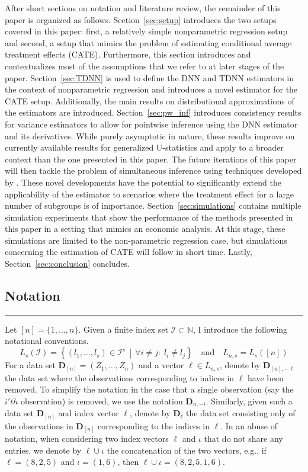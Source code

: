 After short sections on notation and literature review, the remainder of this paper is organized as follows.
Section~\ref{sec:setup} introduces the two setups covered in this paper: first, a relatively simple nonparametric regression setup and second, a setup that mimics the problem of estimating conditional average treatment effects (CATE).
Furthermore, this section introduces and contextualizes most of the assumptions that we refer to at later stages of the paper.
Section~\ref{sec:TDNN} is used to define the DNN and TDNN estimators in the context of nonparametric regression and introduces a novel estimator for the CATE setup.
Additionally, the main results on distributional approximations of the estimators are introduced.
Section~\ref{sec:pw_inf} introduces consistency results for variance estimators to allow for pointwise inference using the DNN estimator and its derivatives.
While purely asymptotic in nature, these results improve on currently available results for generalized U-statistics and apply to a broader context than the one presented in this paper.
The future iterations of this paper will then tackle the problem of simultaneous inference using techniques developed by \citet{ritzwoller_simultaneous_2024}.
These novel developments have the potential to significantly extend the applicability of the estimator to scenarios where the treatment effect for a large number of subgroups is of importance.
Section~\ref{sec:simulations} contains multiple simulation experiments that show the performance of the methods presented in this paper in a setting that mimics an economic analysis.
At this stage, these simulations are limited to the non-parametric regression case, but simulations concerning the estimation of CATE will follow in short time.
Lastly, Section~\ref{sec:conclusion} concludes.

\subsection{Notation}
\hrule
Let $[n] = \{1, \dotsc, n\}$.
Given a finite index set $\mathcal{I} \subset \mathbb{N}$, I introduce the following notational conventions.
\begin{equation}
	L_{s}(\mathcal{I}) = \left\{\left(l_1, \dotsc, l_s\right) \in \mathcal{I}^{s} \, \middle| \, \forall i \neq j: \; l_i \neq l_j\right\}
	\quad \text{and} \quad
	L_{n,s} = L_s\left([n]\right)
\end{equation}
For a data set $\mathbf{D}_{[n]} = \left(Z_1, \dotsc, Z_{n}\right)$ and a vector $\ell \in L_{n,s}$, denote by $\mathbf{D}_{[n], -\ell}$ the data set where the observations corresponding to indices in $\ell$ have been removed.
To simplify the notation in the case that a single observation (say the $i'th$ observation) is removed, we use the notation $\mathbf{D}_{n, -i}$.
Similarly, given such a data set $\mathbf{D}_{[n]}$ and index vector $\ell$, denote by $\mathbf{D}_{\ell}$ the data set consisting only of the observations in $\mathbf{D}_{[n]}$ corresponding to the indices in $\ell$.
In an abuse of notation, when considering two index vectors $\ell$ and $\iota$ that do not share any entries, we denote by $\ell \cup \iota$ the concatenation of the two vectors, e.g., if $\ell = (8,2,5)$ and $\iota = (1,6)$, then $\ell \cup \iota = (8,2,5,1,6)$.

